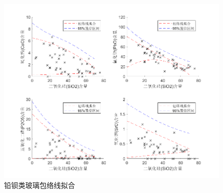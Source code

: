 \documentclass[withoutpreface,bwprint]{cumcmthesis}
\begin{document}
\begin{figure}[H]
	\centering
	\includegraphics[scale=0.5]{铅钡类玻璃包络线拟合.png}
	\caption{铅钡类玻璃包络线拟合}
	\label{fig:铅钡类玻璃包络线拟合}
\end{figure}
\end{document}
